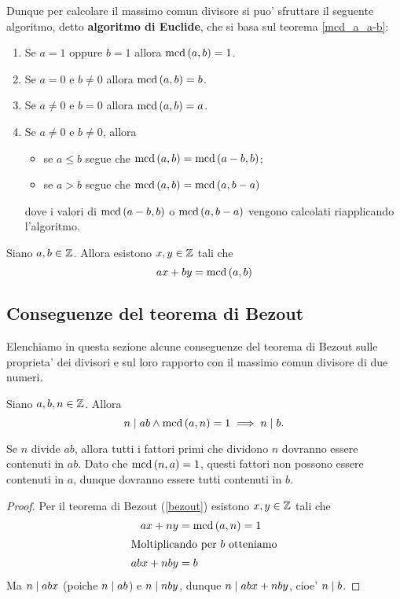 Dunque per calcolare il massimo comun divisore si puo' sfruttare il seguente algoritmo, detto \textbf{algoritmo di Euclide}, che si basa sul teorema \ref{mcd_a_a-b}:
\begin{enumerate}
    \item Se $a = 1$ oppure $b = 1$ allora $\operatorname{mcd}\left(a, b\right) = 1$.
    \item Se $a = 0$ e $b \neq 0$ allora $\operatorname{mcd}\left(a, b\right) = b$.
    \item Se $a \neq 0$ e $b = 0$ allora $\operatorname{mcd}\left(a, b\right) = a$.
    \item Se $a \neq 0$ e $b \neq 0$, allora
        \begin{itemize}
            \item se $a \leq b$ segue che $\operatorname{mcd}\left(a, b\right) = \operatorname{mcd}\left(a - b, b\right)$;
            \item se $a > b$ segue che $\operatorname{mcd}\left(a, b\right) = \operatorname{mcd}\left(a, b - a\right)$
        \end{itemize}
        dove i valori di $\operatorname{mcd}\left(a - b, b\right)$ o $\operatorname{mcd}\left(a, b - a\right)$ vengono calcolati riapplicando l'algoritmo.
\end{enumerate}

\begin{theorem}
    [di Bezout] \label{bezout}
    Siano $a, b \in \mathbb{Z}$. Allora esistono $x, y \in \mathbb{Z}$ tali che
    \begin{equation}
        ax + by = \operatorname{mcd}\left(a, b\right) 
    \end{equation}
\end{theorem}

\subsection{Conseguenze del teorema di Bezout}

Elenchiamo in questa sezione alcune conseguenze del teorema di Bezout sulle proprieta' dei divisori e sul loro rapporto con il massimo comun divisore di due numeri.

\begin{proposition} \label{n_divides_product}
    Siano $a, b, n \in \mathbb{Z}$. Allora \begin{equation}
        n \mid ab \land \operatorname{mcd}\left(a, n\right) = 1 \implies n \mid b.
    \end{equation}
\end{proposition}
\begin{intuition}
    Se $n$ divide $ab$, allora tutti i fattori primi che dividono $n$ dovranno essere contenuti in $ab$. Dato che $\operatorname{mcd}\left(n, a\right) = 1$, questi fattori non possono essere contenuti in $a$, dunque dovranno essere tutti contenuti in $b$.
\end{intuition}
\begin{proof}
    Per il teorema di Bezout (\ref{bezout}) esistono $x, y \in \mathbb{Z}$ tali che 
    \begin{align*}
        ax + ny &= \operatorname{mcd}\left(a, n\right) = 1 \\
        \intertext{Moltiplicando per $b$ otteniamo}
        abx + nby &= b 
    \end{align*}
    Ma $n \mid abx$ (poiche $n \mid ab$) e $n \mid nby$, dunque $n \mid abx + nby$, 
    cioe' $n \mid b$.
\end{proof}

